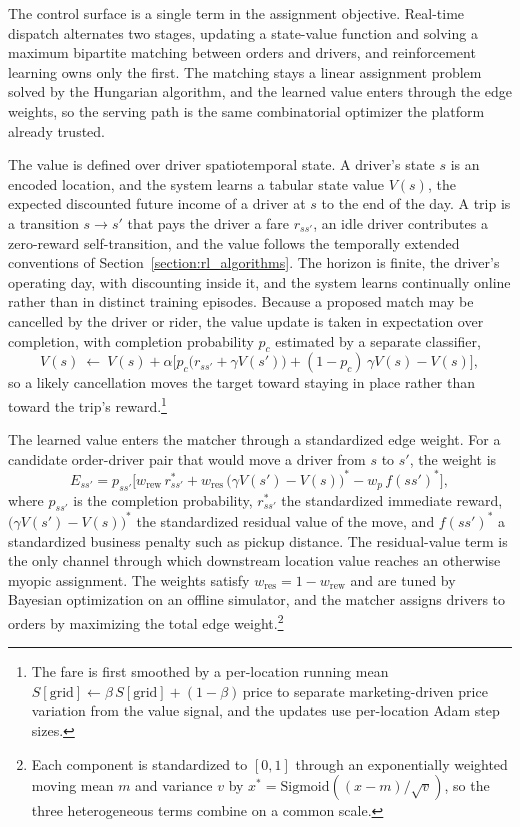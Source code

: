 The control surface is a single term in the assignment objective. Real-time dispatch alternates two stages, updating a state-value function and solving a maximum bipartite matching between orders and drivers, and reinforcement learning owns only the first. The matching stays a linear assignment problem solved by the Hungarian algorithm, and the learned value enters through the edge weights, so the serving path is the same combinatorial optimizer the platform already trusted.

The value is defined over driver spatiotemporal state. A driver's state $s$ is an encoded location, and the system learns a tabular state value $V(s)$, the expected discounted future income of a driver at $s$ to the end of the day. A trip is a transition $s\to s'$ that pays the driver a fare $r_{ss'}$, an idle driver contributes a zero-reward self-transition, and the value follows the temporally extended conventions of Section~\ref{section:rl_algorithms}. The horizon is finite, the driver's operating day, with discounting inside it, and the system learns continually online rather than in distinct training episodes. Because a proposed match may be cancelled by the driver or rider, the value update is taken in expectation over completion, with completion probability $p_c$ estimated by a separate classifier,
\begin{equation}
V(s)\ \leftarrow\ V(s)+\alpha\Big[p_c\big(r_{ss'}+\gamma V(s')\big)+(1-p_c)\,\gamma V(s)-V(s)\Big],
\end{equation}
so a likely cancellation moves the target toward staying in place rather than toward the trip's reward.\footnote{The fare is first smoothed by a per-location running mean $S[\text{grid}]\leftarrow\beta\,S[\text{grid}]+(1-\beta)\,\text{price}$ to separate marketing-driven price variation from the value signal, and the updates use per-location Adam step sizes.}

The learned value enters the matcher through a standardized edge weight. For a candidate order-driver pair that would move a driver from $s$ to $s'$, the weight is
\begin{equation}
E_{ss'}=p_{ss'}\Big[w_{\mathrm{rew}}\,r^{*}_{ss'}+w_{\mathrm{res}}\,\big(\gamma V(s')-V(s)\big)^{*}-w_{p}\,f(ss')^{*}\Big],
\end{equation}
where $p_{ss'}$ is the completion probability, $r^{*}_{ss'}$ the standardized immediate reward, $\big(\gamma V(s')-V(s)\big)^{*}$ the standardized residual value of the move, and $f(ss')^{*}$ a standardized business penalty such as pickup distance. The residual-value term is the only channel through which downstream location value reaches an otherwise myopic assignment. The weights satisfy $w_{\mathrm{res}}=1-w_{\mathrm{rew}}$ and are tuned by Bayesian optimization on an offline simulator, and the matcher assigns drivers to orders by maximizing the total edge weight.\footnote{Each component is standardized to $[0,1]$ through an exponentially weighted moving mean $m$ and variance $v$ by $x^{*}=\mathrm{Sigmoid}((x-m)/\sqrt{v})$, so the three heterogeneous terms combine on a common scale.}

